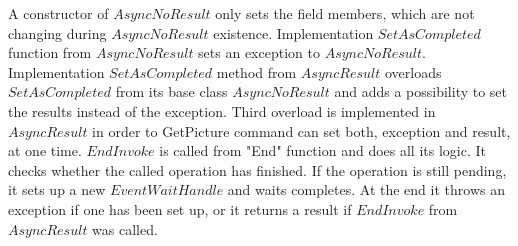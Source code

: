 	A constructor of $AsyncNoResult$ only sets the field members, 
	which are not changing during $AsyncNoResult$ existence.
	Implementation $SetAsCompleted$ function from $AsyncNoResult$ sets an exception to $AsyncNoResult$.
	Implementation $SetAsCompleted$ method from $AsyncResult$ overloads $SetAsCompleted$ 
	from its base class $AsyncNoResult$
	and adds a possibility to set the results instead of the exception.
	Third overload is implemented in $AsyncResult$ in order to GetPicture command can set both, 
	exception and result, at one time.
	$EndInvoke$ is called from "End" function and does all its logic. It checks whether the called 
	operation has finished.	If the operation is still pending, it sets up a new $EventWaitHandle$ 
	and waits completes. At the end it throws an exception if one has been set up, 
	or it returns a result if $EndInvoke$ from $AsyncResult$ was called.

